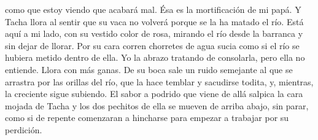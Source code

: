 	como que estoy viendo que acabará mal. Ésa es la mortificación de mi papá.
\pend
%
\pstart
	Y Tacha llora al sentir que su vaca no volverá porque se la ha matado el río. Está aquí a mi lado, con su vestido color de rosa, mirando el río desde la barranca y sin dejar de llorar. Por su cara corren chorretes de agua sucia como si el río se hubiera metido dentro de ella.
\pend
%
\pstart
	Yo la abrazo tratando de consolarla, pero ella no entiende. Llora con más ganas. De su boca sale un ruido semejante al que se arrastra por las orillas del río, que la hace temblar y sacudirse todita, y, mientras, la creciente sigue subiendo. El sabor a podrido que viene de allá salpica la cara mojada de Tacha y los dos pechitos de ella se mueven de arriba abajo, sin parar, como si de repente comenzaran a hincharse para empezar a trabajar por su perdición.
\pend
